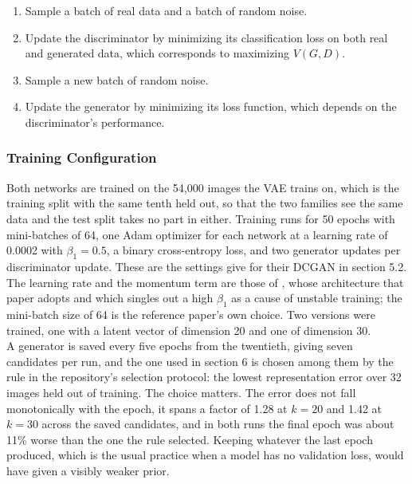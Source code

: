 \begin{enumerate}
    \item Sample a batch of real data and a batch of random noise.
    \item Update the discriminator by minimizing its classification loss on both real and generated data, which corresponds to maximizing \( V(G,D) \).
    \item Sample a new batch of random noise.
    \item Update the generator by minimizing its loss function, which depends on the discriminator's performance.
\end{enumerate}

\subsubsection{Training Configuration}

Both networks are trained on the 54,000 images the VAE trains on, which is the training split with the same tenth held out, so that the two families see the same data and the test split takes no part in either. Training runs for 50 epochs with mini-batches of 64, one Adam optimizer for each network at a learning rate of 0.0002 with \( \beta_1 = 0.5 \), a binary cross-entropy loss, and two generator updates per discriminator update. These are the settings \cite{bora2017} give for their DCGAN in section 5.2. The learning rate and the momentum term are those of \cite{radford2016}, whose architecture that paper adopts and which singles out a high \( \beta_1 \) as a cause of unstable training; the mini-batch size of 64 is the reference paper's own choice. Two versions were trained, one with a latent vector of dimension 20 and one of dimension 30.
\\
A generator is saved every five epochs from the twentieth, giving seven candidates per run, and the one used in section 6 is chosen among them by the rule in the repository's selection protocol: the lowest representation error over 32 images held out of training. The choice matters. The error does not fall monotonically with the epoch, it spans a factor of 1.28 at \( k = 20 \) and 1.42 at \( k = 30 \) across the saved candidates, and in both runs the final epoch was about 11\% worse than the one the rule selected. Keeping whatever the last epoch produced, which is the usual practice when a model has no validation loss, would have given a visibly weaker prior.


